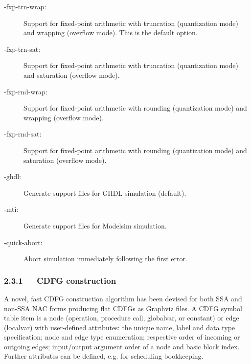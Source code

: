 \documentclass[a4paper]{article}
\begin{document}
\begin{description}
\item[{-fxp-trn-wrap:}] \leavevmode 
Support for fixed-point arithmetic with truncation
(quantization mode) and wrapping (overflow mode). This is
the default option.

\item[{-fxp-trn-sat:}] \leavevmode 
Support for fixed-point arithmetic with truncation
(quantization mode) and saturation (overflow mode).

\item[{-fxp-rnd-wrap:}] \leavevmode 
Support for fixed-point arithmetic with rounding
(quantization mode) and wrapping (overflow mode).

\item[{-fxp-rnd-sat:}] \leavevmode 
Support for fixed-point arithmetic with rounding
(quantization mode) and saturation (overflow mode).

\item[{-ghdl:}] \leavevmode 
Generate support files for GHDL simulation (default).

\item[{-mti:}] \leavevmode 
Generate support files for Modelsim simulation.

\item[{-quick-abort:}] \leavevmode 
Abort simulation immediately following the first error.

\end{description}


\subsubsection{2.3.1~~~CDFG construction%
  \label{cdfg-construction}%
}

A novel, fast CDFG construction algorithm has been devised for both SSA and
non-SSA NAC forms producing flat CDFGs as Graphviz files. A CDFG symbol table
item is a node (operation, procedure call, globalvar, or constant) or edge
(localvar) with user-defined attributes: the unique name, label and data type
specification; node and edge type enumeration; respective order of incoming or
outgoing edges; input/output argument order of a node and basic block index.
Further attributes can be defined, e.g. for scheduling bookkeeping.
\end{document}
